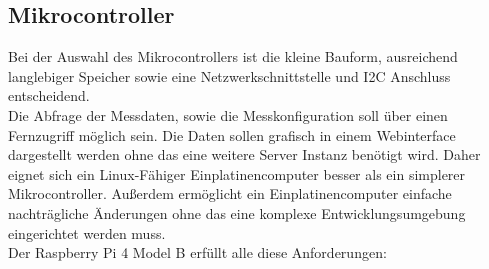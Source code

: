 \subsection{Mikrocontroller}\label{Mikrocontroller}
Bei der Auswahl des Mikrocontrollers ist die kleine Bauform, ausreichend langlebiger Speicher sowie eine Netzwerkschnittstelle und I2C Anschluss entscheidend.\\
Die Abfrage der Messdaten, sowie die Messkonfiguration soll über einen Fernzugriff möglich sein. Die Daten sollen grafisch in einem Webinterface dargestellt werden ohne das eine weitere Server Instanz benötigt wird. Daher eignet sich ein Linux-Fähiger Einplatinencomputer besser als ein simplerer Mikrocontroller.
Außerdem ermöglicht ein Einplatinencomputer einfache nachträgliche Änderungen ohne das eine komplexe Entwicklungsumgebung eingerichtet werden muss.\\

Der Raspberry Pi 4 Model B erfüllt alle diese Anforderungen:

